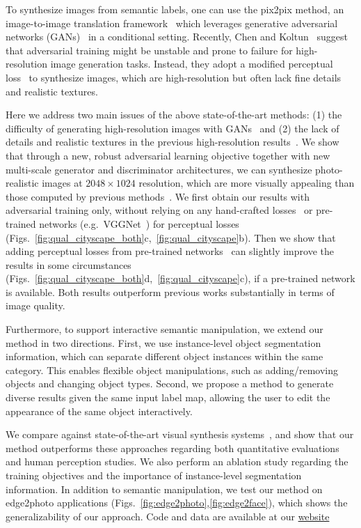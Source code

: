 To synthesize images from semantic labels, one can use the pix2pix method, an image-to-image translation framework~\cite{isola2016image} which leverages generative adversarial networks (GANs)~\cite{goodfellow2014generative} in a conditional setting. Recently, Chen and Koltun~\cite{chen2017photographic} suggest that adversarial training might be unstable and prone to failure for high-resolution image generation tasks. Instead, they adopt a modified perceptual loss~\cite{gatys2016image,dosovitskiy2016generating,johnson2016perceptual} to synthesize images, which are high-resolution but often lack fine details and realistic textures.

Here we address two main issues of the above state-of-the-art methods: (1) the difficulty of generating high-resolution images with GANs~\cite{isola2016image} and (2) the lack of details and realistic textures in the previous high-resolution results~\cite{chen2017photographic}. We show that through a new, robust adversarial learning objective together with new multi-scale generator and discriminator architectures, we can synthesize photo-realistic images at $2048\times 1024$ resolution, which are more visually appealing than those computed by previous methods~\cite{isola2016image,chen2017photographic}. We first obtain our results with adversarial training only, without relying on any hand-crafted losses~\cite{rudin1992nonlinear} or pre-trained networks (e.g.\ VGGNet~\cite{simonyan2014very}) for perceptual losses~\cite{dosovitskiy2016generating,johnson2016perceptual} (Figs.~\ref{fig:qual_cityscape_both}c,~\ref{fig:qual_cityscape}b). Then we show that adding perceptual losses from pre-trained networks~\cite{simonyan2014very} can slightly improve the results in some circumstances (Figs.~\ref{fig:qual_cityscape_both}d,~\ref{fig:qual_cityscape}c), if a pre-trained network is available. Both results outperform previous works substantially in terms of image quality.

Furthermore, to support interactive semantic manipulation, we extend our method in two directions. First, we use instance-level object segmentation information, which can separate different object instances within the same category. This enables flexible object manipulations, such as adding/removing objects and changing object types. Second, we propose a method to generate diverse results given the same input label map, allowing the user to edit the appearance of the same object interactively.

We compare against state-of-the-art visual synthesis systems~\cite{chen2017photographic,isola2016image}, and show that our method outperforms these approaches regarding both quantitative evaluations and human perception studies. We also perform an ablation study regarding the training objectives and the importance of instance-level segmentation information. In addition to semantic manipulation, we test our method on edge2photo applications (Figs.~\ref{fig:edge2photo},\ref{fig:edge2face}), which shows the generalizability of our approach. Code and data are available at our \href{https://tcwang0509.github.io/pix2pixHD/}{website}

